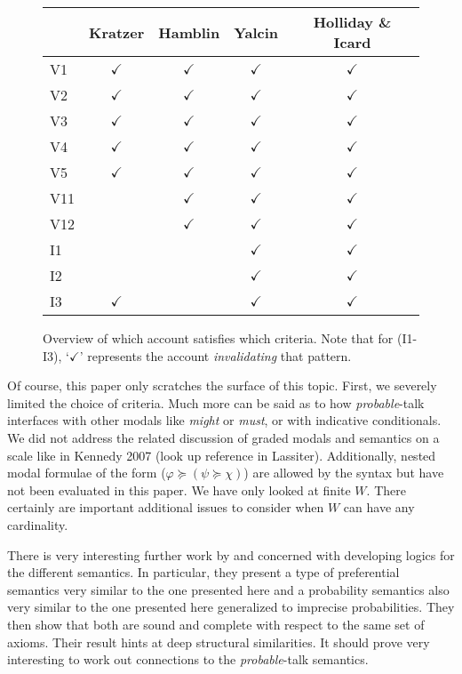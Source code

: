 \documentclass{article}
\theoremstyle{definition}
\begin{document}
\begin{figure}[ht]
\begin{center}
\begin{tabular}{lcccc}
 & Kratzer & Hamblin & Yalcin & Holliday \& Icard\\
\hline
V1 & \(\checkmark\) & \(\checkmark\) & \(\checkmark\) & \(\checkmark\)\\
V2 & \(\checkmark\) & \(\checkmark\) & \(\checkmark\) & \(\checkmark\)\\
V3 & \(\checkmark\) & \(\checkmark\) & \(\checkmark\) & \(\checkmark\)\\
V4 & \(\checkmark\) & \(\checkmark\) & \(\checkmark\) & \(\checkmark\)\\
V5 & \(\checkmark\) & \(\checkmark\) & \(\checkmark\) & \(\checkmark\)\\
\hline
V11 & \texttimes{} & \(\checkmark\) & \(\checkmark\) & \(\checkmark\)\\
V12 & \texttimes{} & \(\checkmark\) & \(\checkmark\) & \(\checkmark\)\\
\hline
I1 & \texttimes{} & \texttimes{} & \(\checkmark\) & \(\checkmark\)\\
I2 & \texttimes{} & \texttimes{} & \(\checkmark\) & \(\checkmark\)\\
I3 & \(\checkmark\) & \texttimes{} & \(\checkmark\) & \(\checkmark\)\\
\end{tabular}
\end{center}
\caption{Overview of which account satisfies which criteria. Note that for
  (I1-I3), `$\checkmark$' represents the account \emph{invalidating} that pattern.}
\label{fig:table}
\end{figure}

Of course, this paper only scratches the surface of this topic. First, we severely limited the choice of criteria. Much more can be said as to how \emph{probable}-talk interfaces with other modals like \emph{might} or \emph{must}, or with indicative conditionals.
We did not address the related discussion of graded modals and semantics on a scale like in Kennedy 2007 (look up reference in Lassiter).
Additionally, nested modal formulae of the form ($\varphi \succeq (\psi \succeq \chi)$) are allowed by the syntax but have not been evaluated in this paper.
We have only looked at finite $W$. There certainly are important additional issues to consider when $W$ can have any cardinality.

There is very interesting further work by \textcite{holliday13_measur} and \textcite{harrison-trainor17_prefer} concerned with developing logics for the different semantics.
In particular, they present a type of preferential semantics very similar to the one presented here
and a probability semantics also very similar to the one presented here generalized to imprecise probabilities.
They then show that both are sound and complete with respect to the same set of axioms.
Their result hints at deep structural similarities.
It should prove very interesting to work out connections to the \emph{probable}-talk semantics.

 \printbibliography
\end{document}
